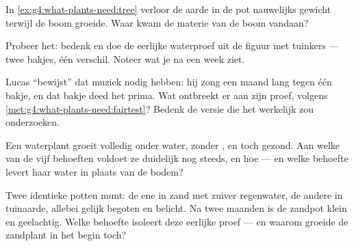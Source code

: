 \begin{exercise}[$\star$]\label{exo:g4:what-plants-need:7}
In \cref{ex:g4:what-plants-need:tree} verloor de aarde in de pot
nauwelijks gewicht terwijl de boom groeide. Waar kwam de materie van de
boom vandaan?
\end{exercise}

\begin{exercise}[$\star$]\label{exo:g4:what-plants-need:8}
Probeer het: bedenk en doe de eerlijke waterproef uit de figuur met
tuinkers --- twee bakjes, één verschil. Noteer wat je na een week ziet.
\end{exercise}

\begin{exercise}[$\star\star$]\label{exo:g4:what-plants-need:9}
Lucas ``bewijst'' dat  muziek nodig hebben: hij zong een maand
lang tegen één bakje, en dat bakje deed het prima. Wat ontbreekt er aan
zijn proef, volgens \cref{met:g4:what-plants-need:fairtest}? Bedenk de
versie die het werkelijk zou onderzoeken.
\end{exercise}

\begin{exercise}[$\star\star$]\label{exo:g4:what-plants-need:10}
Een waterplant groeit volledig onder water, zonder , en toch
gezond. Aan welke van de vijf behoeften voldoet ze duidelijk nog steeds,
en hoe --- en welke behoefte levert haar water in plaats van de bodem?
\end{exercise}

\begin{exercise}[$\star\star\star$]\label{exo:g4:what-plants-need:11}
Twee identieke potten munt: de ene in zand met zuiver regenwater, de
andere in tuinaarde, allebei gelijk begoten en belicht. Na twee maanden
is de zandpot klein en geelachtig. Welke behoefte isoleert deze
eerlijke proef --- en waarom groeide de zandplant in het begin toch?
\end{exercise}
